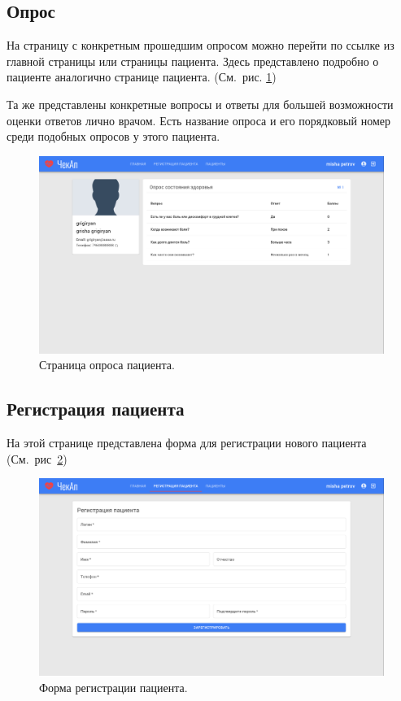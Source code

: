 \subsection{Опрос}\label{subsec:2}
На страницу с конкретным прошедшим опросом можно перейти по ссылке из главной страницы или страницы пациента.
Здесь представлено подробно о пациенте аналогично странице пациента.
(См.\ рис. \ref{fig:figure6})

Та же представлены конкретные вопросы и ответы для большей возможности оценки ответов лично врачом.
Есть название опроса и его порядковый номер среди подобных опросов у этого пациента.
\begin{figure}[ht]
    \includegraphics[width=\textwidth]{images/screenshots/inquirer}
    \caption{Страница опроса пациента.}
    \label{fig:figure6}
\end{figure}

\newpage
\subsection{Регистрация пациента}\label{subsec:-3}
На этой странице представлена форма для регистрации нового пациента (См.\ рис~\ref{fig:figure7})
\begin{figure}[ht]
    \includegraphics[scale=0.17]{images/screenshots/patient_registration}
    \caption{Форма регистрации пациента.}\label{fig:figure7}
\end{figure}

